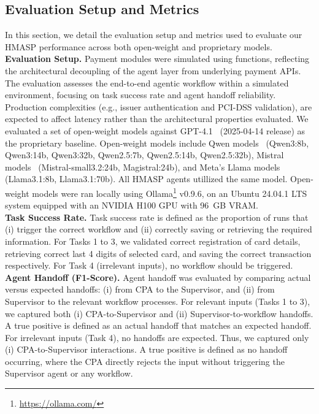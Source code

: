 \documentclass[runningheads]{llncs}
\begin{document}
\subsection{Evaluation Setup and Metrics}
In this section, we detail the evaluation setup and metrics used to evaluate our HMASP performance across both open-weight and proprietary models.\\ 

\noindent\textbf{Evaluation Setup.} 
Payment modules were simulated using functions, reflecting the architectural decoupling of the agent layer from underlying payment APIs. The evaluation assesses the end-to-end agentic workflow within a simulated environment, focusing on task success rate and agent handoff reliability. Production complexities (e.g., issuer authentication and PCI-DSS validation), are expected to affect latency rather than the architectural properties evaluated. We evaluated a set of open-weight models against GPT-4.1~\cite{achiam2023gpt} (2025-04-14 release) as the proprietary baseline. Open-weight models include Qwen models~\cite{qwen3,qwen2.5} (Qwen3:8b, Qwen3:14b, Qwen3:32b, Qwen2.5:7b, Qwen2.5:14b, Qwen2.5:32b), Mistral models~\cite{rastogi2025magistral} (Mistral-small3.2:24b, Magistral:24b), and Meta's Llama models~\cite{grattafiori2024llama} (Llama3.1:8b, Llama3.1:70b). All HMASP agents utillized the same model. Open-weight models were ran locally using Ollama\footnote{\url{https://ollama.com/}} v0.9.6, on an Ubuntu 24.04.1 LTS system equipped with an NVIDIA H100 GPU with 96~GB VRAM.\\

\noindent\textbf{Task Success Rate.}
Task success rate is defined as the proportion of runs that (i) trigger the correct workflow and (ii) correctly saving or retrieving the required information. For Tasks 1 to 3, we validated correct registration of card details, retrieving correct last 4 digits of selected card, and saving the correct transaction respectively. For Task 4 (irrelevant inputs), no workflow should be triggered.\\

\noindent\textbf{Agent Handoff (F1-Score).}
Agent handoff was evaluated by comparing actual versus expected handoffs: (i) from CPA to the Supervisor, and (ii) from Supervisor to the relevant workflow processes.
For relevant inputs (Tasks 1 to 3), we captured both (i) CPA-to-Supervisor and (ii) Supervisor-to-workflow handoffs. A true positive is defined as an actual handoff that matches an expected handoff. For irrelevant inputs (Task 4), no handoffs are expected. Thus, we captured only (i) CPA-to-Supervisor interactions. A true positive is defined as no handoff occurring, where the CPA directly rejects the input without triggering the Supervisor agent or any workflow.\\
\end{document}

